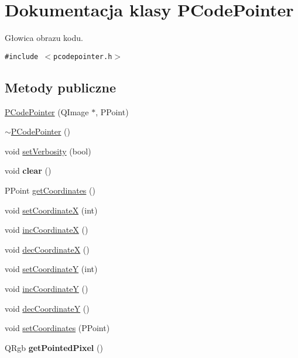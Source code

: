 \hypertarget{classPCodePointer}{
\section{Dokumentacja klasy PCodePointer}
\label{classPCodePointer}
}
Głowica obrazu kodu.  


{\tt \#include $<$pcodepointer.h$>$}

\subsection*{Metody publiczne}
\begin{CompactItemize}
\item 
\hyperlink{classPCodePointer_cd5cd1cd86ff9cf89ac6d2aae5cb52d8}{PCodePointer} (QImage $\ast$, PPoint)
\item 
\hyperlink{classPCodePointer_dc12b4bda6ed4b1045b0767b41ff2efa}{$\sim$PCodePointer} ()
\item 
void \hyperlink{classPCodePointer_d738019c8cb766c0863e2c00622d9fc9}{setVerbosity} (bool)
\item 
\hypertarget{classPCodePointer_fb47282905de53ad98a0c3d76dbd0fb0}{
void \textbf{clear} ()}
\label{classPCodePointer_fb47282905de53ad98a0c3d76dbd0fb0}

\item 
PPoint \hyperlink{classPCodePointer_c792e5bc527542482542ed22acc9cca4}{getCoordinates} ()
\item 
void \hyperlink{classPCodePointer_9bcf58c97f704e3be2deefb588f91312}{setCoordinateX} (int)
\item 
void \hyperlink{classPCodePointer_ef8324dbdca82baa094e47e36f978669}{incCoordinateX} ()
\item 
void \hyperlink{classPCodePointer_3b98e9637236aa9d975dc59c0397e625}{decCoordinateX} ()
\item 
void \hyperlink{classPCodePointer_9fd77f14e39cc30f8cfc583ce97aa2f2}{setCoordinateY} (int)
\item 
void \hyperlink{classPCodePointer_58c15d4d1abb1fb971170f19c3b9e8cf}{incCoordinateY} ()
\item 
void \hyperlink{classPCodePointer_cc8b95bb3786748c1aff41eed6d299e1}{decCoordinateY} ()
\item 
void \hyperlink{classPCodePointer_117bf9322b4fdcb189c41a6f2f113a4b}{setCoordinates} (PPoint)
\item 
\hypertarget{classPCodePointer_6544ee43112dcafb5fc7c865ced682f0}{
QRgb \textbf{getPointedPixel} ()}
\label{classPCodePointer_6544ee43112dcafb5fc7c865ced682f0}


\end{CompactItemize}
